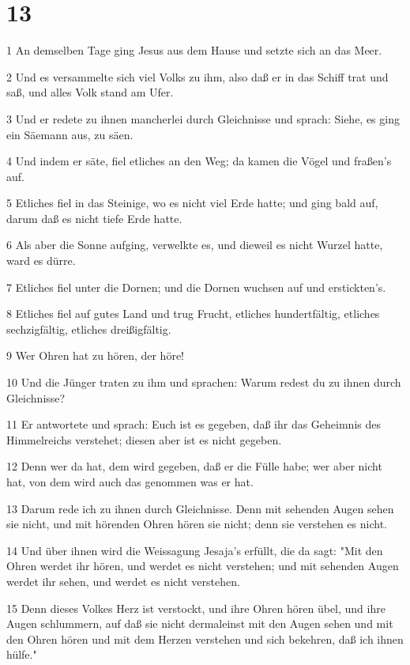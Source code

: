 \chapter{13}

\par 1 An demselben Tage ging Jesus aus dem Hause und setzte sich an das Meer.
\par 2 Und es versammelte sich viel Volks zu ihm, also daß er in das Schiff trat und saß, und alles Volk stand am Ufer.
\par 3 Und er redete zu ihnen mancherlei durch Gleichnisse und sprach: Siehe, es ging ein Säemann aus, zu säen.
\par 4 Und indem er säte, fiel etliches an den Weg; da kamen die Vögel und fraßen's auf.
\par 5 Etliches fiel in das Steinige, wo es nicht viel Erde hatte; und ging bald auf, darum daß es nicht tiefe Erde hatte.
\par 6 Als aber die Sonne aufging, verwelkte es, und dieweil es nicht Wurzel hatte, ward es dürre.
\par 7 Etliches fiel unter die Dornen; und die Dornen wuchsen auf und erstickten's.
\par 8 Etliches fiel auf gutes Land und trug Frucht, etliches hundertfältig, etliches sechzigfältig, etliches dreißigfältig.
\par 9 Wer Ohren hat zu hören, der höre!
\par 10 Und die Jünger traten zu ihm und sprachen: Warum redest du zu ihnen durch Gleichnisse?
\par 11 Er antwortete und sprach: Euch ist es gegeben, daß ihr das Geheimnis des Himmelreichs verstehet; diesen aber ist es nicht gegeben.
\par 12 Denn wer da hat, dem wird gegeben, daß er die Fülle habe; wer aber nicht hat, von dem wird auch das genommen was er hat.
\par 13 Darum rede ich zu ihnen durch Gleichnisse. Denn mit sehenden Augen sehen sie nicht, und mit hörenden Ohren hören sie nicht; denn sie verstehen es nicht.
\par 14 Und über ihnen wird die Weissagung Jesaja's erfüllt, die da sagt: "Mit den Ohren werdet ihr hören, und werdet es nicht verstehen; und mit sehenden Augen werdet ihr sehen, und werdet es nicht verstehen.
\par 15 Denn dieses Volkes Herz ist verstockt, und ihre Ohren hören übel, und ihre Augen schlummern, auf daß sie nicht dermaleinst mit den Augen sehen und mit den Ohren hören und mit dem Herzen verstehen und sich bekehren, daß ich ihnen hülfe."
